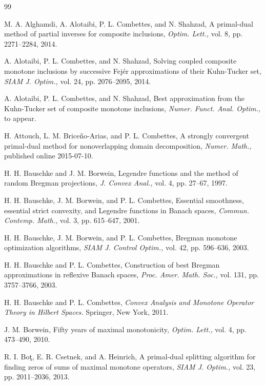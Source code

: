 \documentclass[a4paper,11pt,fleqn]{article}
\theoremstyle{plain}{\theorembodyfont{\rmfamily}%
\newtheorem{conjecture}[theorem]{Conjecture}}
\theoremstyle{plain}{\theorembodyfont{\rmfamily}%
\newtheorem{example}[theorem]{Example}}
\theoremstyle{plain}{\theorembodyfont{\rmfamily}%
\newtheorem{remark}[theorem]{Remark}}
\theoremstyle{plain}{\theorembodyfont{\rmfamily}%
\newtheorem{algorithm}[theorem]{Algorithm}}
\theoremstyle{plain}{\theorembodyfont{\rmfamily}%
\newtheorem{condition}[theorem]{Condition}}
\theoremstyle{plain}{\theorembodyfont{\rmfamily}%
\newtheorem{definition}[theorem]{Definition}}
\theoremstyle{plain}{\theorembodyfont{\rmfamily}
\newtheorem{problem}[theorem]{Problem}}
\theoremstyle{plain}{\theorembodyfont{\rmfamily}
\newtheorem{notation}[theorem]{Notation}}
\numberwithin{equation}{section}
\begin{document}
\begin{thebibliography}{99}
\small

M. A. Alghamdi, A. Alotaibi, P. L. Combettes, and N. Shahzad,
A primal-dual method of partial inverses for composite
inclusions,
{\em Optim. Lett.,}
vol. 8, pp. 2271--2284, 2014.

A. Alotaibi, P. L. Combettes, and N. Shahzad,
Solving coupled composite monotone inclusions by successive 
Fej\'er approximations of their Kuhn-Tucker set,
{\em SIAM J. Optim.,}
vol. 24, pp. 2076--2095, 2014. 

A. Alotaibi, P. L. Combettes, and N. Shahzad,
Best approximation from the Kuhn-Tucker set
of composite monotone inclusions,
{\em Numer. Funct. Anal. Optim.,}
to appear.

H. Attouch, L. M. Brice\~{n}o-Arias, and P. L. Combettes, 
A strongly convergent primal-dual method for
nonoverlapping domain decomposition,
{\em Numer. Math.,}
published online 2015-07-10.

H. H. Bauschke and J. M. Borwein, 
Legendre functions and the method of random Bregman projections, 
{\em J. Convex Anal.,}  
vol. 4, pp. 27--67, 1997.

H. H. Bauschke, J. M. Borwein, and P. L. Combettes,
Essential smoothness, essential strict convexity, and
Legendre functions in Banach spaces,
{\em Commun. Contemp. Math.,}  
vol. 3, pp. 615--647, 2001.

H. H. Bauschke, J. M. Borwein, and P. L. Combettes,
Bregman monotone optimization algorithms,
{\em SIAM J. Control Optim.,} 
vol. 42, pp. 596--636, 2003.
 
H. H. Bauschke and P. L. Combettes, 
Construction of best Bregman approximations in reflexive Banach 
spaces,
{\em Proc. Amer. Math. Soc.,}
vol. 131, pp. 3757--3766, 2003.

H. H. Bauschke and P. L. Combettes,
{\em Convex Analysis and Monotone Operator Theory in Hilbert 
Spaces.}
Springer, New York, 2011.

J. M. Borwein,
Fifty years of maximal monotonicity,
{\em Optim. Lett.,}
vol. 4, pp. 473--490, 2010.

R. I. Bo{\c{t}}, E. R. Csetnek, and A. Heinrich,
A primal-dual splitting algorithm for finding zeros of sums 
of maximal monotone operators,
{\em SIAM J. Optim.,}
vol. 23, pp. 2011--2036, 2013.


\end{thebibliography}
\end{document}
